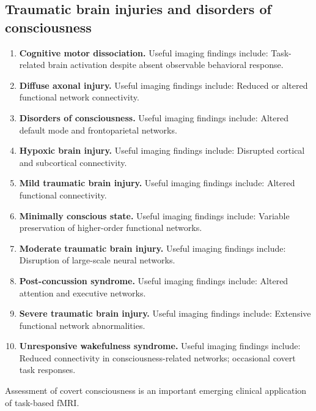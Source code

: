 \subsection{Traumatic brain injuries and disorders of consciousness}
\begin{enumerate}[leftmargin=*,itemsep=0.45em,topsep=0.4em]
\item \textbf{Cognitive motor dissociation.} Useful imaging findings include: Task-related brain activation despite absent observable behavioral response.
\item \textbf{Diffuse axonal injury.} Useful imaging findings include: Reduced or altered functional network connectivity.
\item \textbf{Disorders of consciousness.} Useful imaging findings include: Altered default mode and frontoparietal networks.
\item \textbf{Hypoxic brain injury.} Useful imaging findings include: Disrupted cortical and subcortical connectivity.
\item \textbf{Mild traumatic brain injury.} Useful imaging findings include: Altered functional connectivity.
\item \textbf{Minimally conscious state.} Useful imaging findings include: Variable preservation of higher-order functional networks.
\item \textbf{Moderate traumatic brain injury.} Useful imaging findings include: Disruption of large-scale neural networks.
\item \textbf{Post-concussion syndrome.} Useful imaging findings include: Altered attention and executive networks.
\item \textbf{Severe traumatic brain injury.} Useful imaging findings include: Extensive functional network abnormalities.
\item \textbf{Unresponsive wakefulness syndrome.} Useful imaging findings include: Reduced connectivity in consciousness-related networks; occasional covert task responses.
\end{enumerate}
Assessment of covert consciousness is an important emerging clinical application of task-based fMRI.

